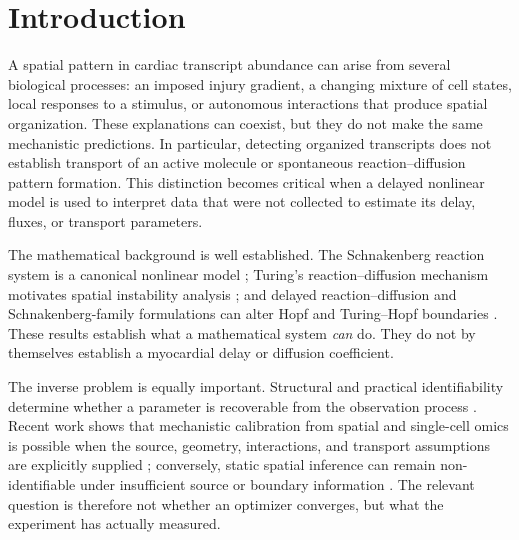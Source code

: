 \documentclass[preprint,11pt]{elsarticle}
\begin{document}
\modulolinenumbers[5]
\linenumbers

\section{Introduction}
A spatial pattern in cardiac transcript abundance can arise from several biological processes: an imposed injury gradient, a changing mixture of cell states, local responses to a stimulus, or autonomous interactions that produce spatial organization. These explanations can coexist, but they do not make the same mechanistic predictions. In particular, detecting organized transcripts does not establish transport of an active molecule or spontaneous reaction--diffusion pattern formation. This distinction becomes critical when a delayed nonlinear model is used to interpret data that were not collected to estimate its delay, fluxes, or transport parameters.

The mathematical background is well established. The Schnakenberg reaction system is a canonical nonlinear model \cite{Schnakenberg1979}; Turing's reaction--diffusion mechanism motivates spatial instability analysis \cite{Turing1952,Kondo2010}; and delayed reaction--diffusion and Schnakenberg-family formulations can alter Hopf and Turing--Hopf boundaries \cite{Alfifi2022,Jiang2019,Sargood2022,Das2026}. These results establish what a mathematical system \emph{can} do. They do not by themselves establish a myocardial delay or diffusion coefficient.

The inverse problem is equally important. Structural and practical identifiability determine whether a parameter is recoverable from the observation process \cite{Raue2009,Villaverde2016,Wieland2021,Simpson2020}. Recent work shows that mechanistic calibration from spatial and single-cell omics is possible when the source, geometry, interactions, and transport assumptions are explicitly supplied \cite{Daher2026}; conversely, static spatial inference can remain non-identifiable under insufficient source or boundary information \cite{MatasGil2024,Gu2026}. The relevant question is therefore not whether an optimizer converges, but what the experiment has actually measured.
\end{document}
